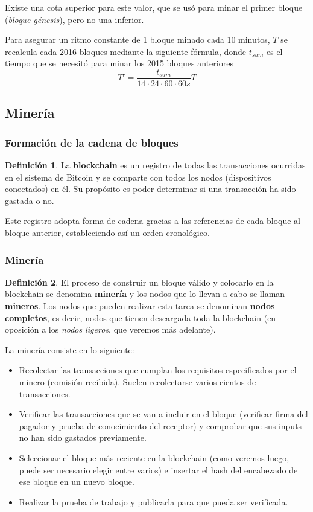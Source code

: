 \documentclass{beamer}
\theoremstyle{definition}
\newtheorem{defi}{Definición}
\begin{document}
\begin{frame}
	Existe una cota superior para este valor, que se usó para minar el primer bloque (\emph{bloque génesis}), pero no una inferior. 
	
	Para asegurar un ritmo constante de 1 bloque minado cada 10 minutos, $T$ se recalcula cada 2016 bloques mediante la siguiente fórmula, donde $t_{sum}$ es el tiempo que se necesitó para minar los 2015 bloques anteriores
	$$ T' =	\frac{t_{sum}}{14\cdot 24\cdot 60\cdot 60s}T$$
\end{frame}



\subsection{Minería}
\begin{frame}
	\frametitle{Formación de la cadena de bloques}
	
	\begin{defi}
		La \textbf{blockchain} es un registro de todas las transacciones ocurridas en el sistema de Bitcoin y se comparte con todos los nodos (dispositivos conectados) en él. Su propósito es poder determinar si una transacción ha sido gastada o no.
	\end{defi}\pause

Este registro adopta forma de cadena gracias a las referencias de cada bloque al bloque anterior, estableciendo así un orden cronológico.
\end{frame}

\begin{frame}
	\frametitle{Minería}
	\begin{defi}
		El proceso de construir un bloque válido y colocarlo en la blockchain se denomina \textbf{minería} y los nodos que lo llevan a cabo se llaman \textbf{mineros}. Los nodos que pueden realizar esta tarea se denominan \textbf{nodos completos}, es decir, nodos que tienen descargada toda la blockchain (en oposición a los \emph{nodos ligeros}, que veremos más adelante).
	\end{defi}
\end{frame}

\begin{frame}
	La minería consiste en lo siguiente:
	\begin{itemize}
		\item<2-> Recolectar las transacciones que cumplan los requisitos especificados por el minero (comisión recibida). Suelen recolectarse varios cientos de transacciones.
		\item<3-> Verificar las transacciones que se van a incluir en el bloque (verificar firma del pagador y prueba de conocimiento del receptor) y comprobar que sus inputs no han sido gastados previamente.
		\item<4-> Seleccionar el bloque más reciente en la blockchain (como veremos luego, puede ser necesario elegir entre varios) e insertar el hash del encabezado de ese bloque en un nuevo bloque.
		\item<5-> Realizar la prueba de trabajo y publicarla para que pueda ser verificada.  %
	\end{itemize}
\end{frame}
\end{document}

